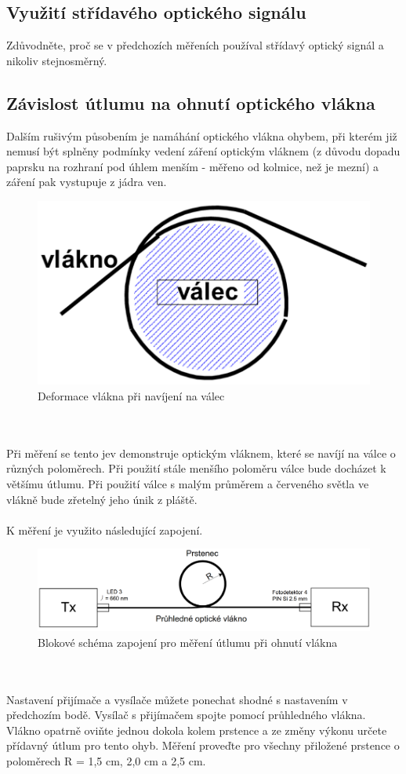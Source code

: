 \subsection{Využití střídavého optického signálu}
Zdůvodněte, proč se v předchozích měřeních používal střídavý optický signál a nikoliv stejnosměrný.

\subsection{Závislost útlumu na ohnutí optického vlákna}
Dalším rušivým působením je namáhání optického vlákna ohybem, při kterém již nemusí být splněny podmínky vedení záření optickým vláknem (z důvodu dopadu paprsku na rozhraní pod úhlem menším - měřeno od kolmice, než je mezní) a záření pak vystupuje z jádra ven.
\begin{figure}[h]
\centering
\includegraphics[width=12cm]{images/obr8.png}
\caption{Deformace vlákna při navíjení na válec}
\label{fig:8}
\end{figure}
\\\\
Při měření se tento jev demonstruje optickým vláknem, které se navíjí na válce o různých poloměrech. Při použití stále menšího poloměru válce bude docházet k většímu útlumu. Při použití válce s malým průměrem a červeného světla ve vlákně bude zřetelný jeho únik z pláště.
\\\\
K měření je využito následující zapojení.
\begin{figure}[h]
\centering
\includegraphics[width=12cm]{images/obr9.png}
\caption{Blokové schéma zapojení pro měření útlumu při ohnutí vlákna}
\label{fig:9}
\end{figure}
\\\\
Nastavení přijímače a vysílače můžete ponechat shodné s nastavením v předchozím bodě. Vysílač s přijímačem spojte pomocí průhledného vlákna. Vlákno opatrně oviňte jednou dokola kolem prstence a ze změny výkonu určete přídavný útlum pro tento ohyb. Měření proveďte pro všechny přiložené prstence o poloměrech R = 1,5 cm, 2,0 cm a 2,5 cm.


